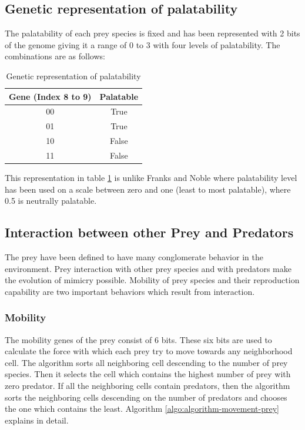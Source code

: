\subsection{Genetic representation of palatability}
\label{sec:genetic-palatability-representation}
The palatability of each prey species is fixed and has been represented with 2 bits of the genome giving it a range of 0 to 3 with four levels of palatability. The combinations are as follows:

\begin{table}[H]
	\centering
	\begin{tabular}{|c|c|}
		\hline
			\textbf{Gene (Index 8 to 9)} &	\textbf{Palatable} \\ \hline
			00									& True 			\\ \hline
			01									& True 			\\ \hline
			10									& False 		\\ \hline
			11									& False 		\\
		\hline
	\end{tabular}
	\caption{Genetic representation of palatability}
	\label{tab:genetic-representation-palatability}
\end{table}

This representation in table \ref{tab:genetic-representation-palatability} is unlike Franks and Noble \cite{franks2003} where palatability level has been used on a scale between zero and one (least to most palatable), where 0.5 is neutrally palatable. 

\subsection{Interaction between other Prey and Predators}
The prey have been defined to have many conglomerate behavior in the environment. Prey interaction with other prey species and with predators make the evolution of mimicry possible. Mobility of prey species and their reproduction capability are two important behaviors which result from interaction. 

\subsubsection{Mobility}
The mobility genes of the prey consist of 6 bits. These six bits are used to calculate the force with which each prey try to move towards any neighborhood cell. The algorithm sorts all neighboring cell descending to the number of prey species. Then it selects the cell which contains the highest number of prey with zero predator. If all the neighboring cells contain predators, then the algorithm sorts the neighboring cells descending on the number of predators and chooses the one which contains the least. Algorithm \ref{algo:algorithm-movement-prey} explains in detail.

